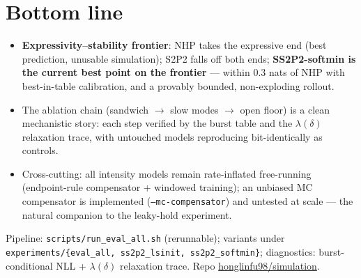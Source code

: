 \documentclass[11pt]{article}
\begin{document}
\section{Bottom line}
\begin{itemize}[leftmargin=1.35em,itemsep=2pt]
\item \textbf{Expressivity--stability frontier}: NHP takes the expressive end (best prediction, unusable
simulation); S2P2 falls off both ends; \textbf{SS2P2-softmin is the current best point on the frontier} ---
within 0.3 nats of NHP with best-in-table calibration, and a provably bounded, non-exploding rollout.
\item The ablation chain (sandwich $\to$ slow modes $\to$ open floor) is a clean mechanistic story: each
step verified by the burst table and the $\lambda(\delta)$ relaxation trace, with untouched models
reproducing bit-identically as controls.
\item Cross-cutting: all intensity models remain rate-inflated free-running (endpoint-rule compensator +
windowed training); an unbiased MC compensator is implemented (\texttt{--mc-compensator}) and untested at
scale --- the natural companion to the leaky-hold experiment.
\end{itemize}

\vspace{-0.3em}
\noindent\footnotesize Pipeline: \texttt{scripts/run\_eval\_all.sh} (rerunnable); variants under
\texttt{experiments/\{eval\_all, ss2p2\_lsinit, ss2p2\_softmin\}}; diagnostics: burst-conditional NLL +
$\lambda(\delta)$ relaxation trace. Repo \href{https://github.com/honglinfu98/simulation}{honglinfu98/simulation}.
\end{document}
